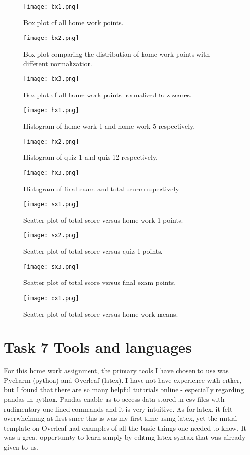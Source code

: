 \documentclass{article}
\begin{document}
\begin{figure}
\centering
\texttt{[image: bx1.png]}
\caption{\label{fig:bx1} Box plot of all home work points.}
\end{figure}
\begin{figure}
\centering
\texttt{[image: bx2.png]}
\caption{\label{fig:bx2} Box plot comparing the distribution of home work points with different normalization.}
\end{figure}
\begin{figure}
\centering
\texttt{[image: bx3.png]}
\caption{\label{fig:bx3} Box plot of all home work points normalized to z scores.}
\end{figure}
\begin{figure}
\centering
\texttt{[image: hx1.png]}
\caption{\label{fig:hx1} Histogram of home work 1 and home work 5 respectively.}
\end{figure}
\begin{figure}
\centering
\texttt{[image: hx2.png]}
\caption{\label{fig:hx2} Histogram of quiz 1 and quiz 12 respectively.}
\end{figure}
\begin{figure}
\centering
\texttt{[image: hx3.png]}
\caption{\label{fig:hx3} Histogram of final exam and total score respectively.}
\end{figure}
\begin{figure}
\centering
\texttt{[image: sx1.png]}
\caption{\label{fig:sx1}Scatter plot of total score versus home work 1 points.}
\end{figure}
\begin{figure}
\centering
\texttt{[image: sx2.png]}
\caption{\label{fig:sx2} Scatter plot of total score versus quiz 1 points.}
\end{figure}
\begin{figure}
\centering
\texttt{[image: sx3.png]}
\caption{\label{fig:sx3} Scatter plot of total score versus final exam points.}
\end{figure}
\begin{figure}
\centering
\texttt{[image: dx1.png]}
\caption{\label{fig:dx1} Scatter plot of total score versus home work means.}
\end{figure}

\section{Task 7 Tools and languages}
For this home work assignment, the primary tools I have chosen to use was Pycharm (python) and Overleaf (latex). I have not have experience with either, but I found that there are so many helpful tutorials online - especially regarding pandas in python. Pandas enable us to access data stored in csv files with rudimentary one-lined commands and it is very intuitive. As for latex, it felt overwhelming at first since this is was my first time using latex, yet the initial template on Overleaf had examples of all the basic things one needed to know. It was a great opportunity to learn simply by editing latex syntax that was already given to us. 
\end{document}
